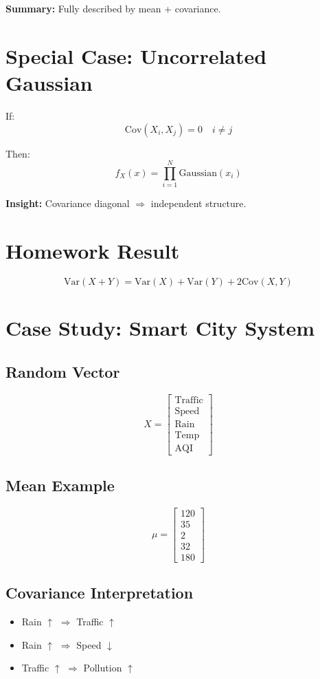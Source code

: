 \documentclass[12pt]{article}
\begin{document}
\textbf{Summary:} Fully described by mean + covariance.

\section{Special Case: Uncorrelated Gaussian}
If:
\[
\text{Cov}(X_i,X_j)=0 \quad i\neq j
\]

Then:
\[
f_X(x) = \prod_{i=1}^N \text{Gaussian}(x_i)
\]

\textbf{Insight:} Covariance diagonal $\Rightarrow$ independent structure.

\section{Homework Result}
\[
\text{Var}(X+Y) = \text{Var}(X) + \text{Var}(Y) + 2\text{Cov}(X,Y)
\]

\section{Case Study: Smart City System}
\subsection{Random Vector}
\[
X =
\begin{bmatrix}
\text{Traffic}\\
\text{Speed}\\
\text{Rain}\\
\text{Temp}\\
\text{AQI}
\end{bmatrix}
\]

\subsection{Mean Example}
\[
\mu =
\begin{bmatrix}
120\\35\\2\\32\\180
\end{bmatrix}
\]

\subsection{Covariance Interpretation}
\begin{itemize}
    \item Rain $\uparrow$ $\Rightarrow$ Traffic $\uparrow$
    \item Rain $\uparrow$ $\Rightarrow$ Speed $\downarrow$
    \item Traffic $\uparrow$ $\Rightarrow$ Pollution $\uparrow$
\end{itemize}
\end{document}
